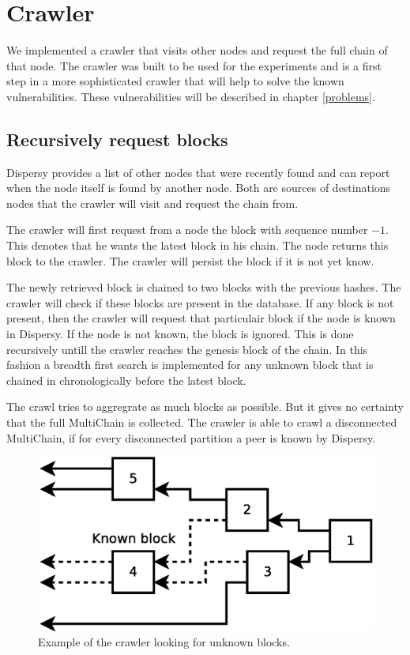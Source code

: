 \section{Crawler}
We implemented a crawler that visits other nodes and request the full chain of that node.
The crawler was built to be used for the experiments and
is a first step in a more sophisticated crawler that will help to solve the known vulnerabilities.
These vulnerabilities will be described in chapter \ref{problems}.

\subsection{Recursively request blocks}
Dispersy provides a list of other nodes that were recently found
and can report when the node itself is found by another node.
Both are sources of destinations nodes that the crawler will visit
and request the chain from.

The crawler will first request from a node the block with sequence number $-1$.
This denotes that he wants the latest block in his chain.
The node returns this block to the crawler.
The crawler will persist the block if it is not yet know.

The newly retrieved block is chained to two blocks with the previous hashes.
The crawler will check if these blocks are present in the database.
If any block is not present,
then the crawler will request that particulair block if the node is known in Dispersy.
If the node is not known, the block is ignored.
This is done recursively untill the crawler reaches the genesis block of the chain.
In this fashion a breadth first search is implemented for any unknown block
that is chained in chronologically before the latest block.

The crawl tries to aggregrate as much blocks as possible.
But it gives no certainty that the full MultiChain is collected.
The crawler is able to crawl a disconnected MultiChain,
if for every disconnected partition a peer is known by Dispersy.

\begin{figure}
	\centerline{\includegraphics[scale=0.3]{design/figs/crawler.eps}}
	\caption{Example of the crawler looking for unknown blocks.}
	\label{fig:crawler-example}
\end{figure}

